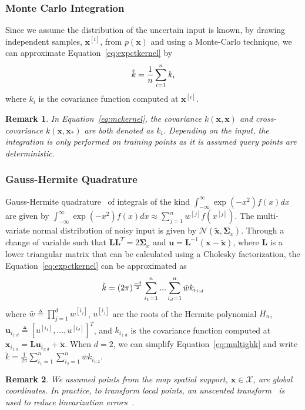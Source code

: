 \documentclass[letterpaper, 10 pt, journal, twoside]{IEEEtran}  %
\newtheorem{remark}{Remark}
\begin{document}
\subsubsection*{Monte Carlo Integration}
\label{subsubsec:montecarlo}
Since we assume the distribution of the uncertain input is known, by drawing independent samples, $\boldsymbol x^{[i]}$, from $p(\boldsymbol x)$ and using a Monte-Carlo technique, we can approximate Equation~\eqref{eq:expctkernel} by
\begin{equation}
 \small
 \label{eq:mckernel}
 \tilde{k} = \frac{1}{n}\sum_{i=1}^{n}k_i
\end{equation}
where $k_i$ is the covariance function computed at $\boldsymbol x^{[i]}$.
\begin{remark}
 In Equation~\eqref{eq:mckernel}, the covariance $k(\boldsymbol x,\boldsymbol x)$ and cross-covariance $k(\boldsymbol x,\boldsymbol x_*)$ are both denoted as $k_i$. Depending on the input, the integration is only performed on training points as it is assumed query points are deterministic.
\end{remark}

\subsubsection*{Gauss-Hermite Quadrature}
\label{subsubsec:gausshermit}
Gauss-Hermite quadrature~\cite{davis2007methods} of integrals of the kind $\int_{-\infty}^{\infty} \exp(-x^2)f(x)dx$ are given by $\int_{-\infty}^{\infty} \exp(-x^2)f(x)dx \approx \sum_{j=1}^n w^{[j]} f(x^{[j]})$.
The multi-variate normal distribution of noisy input is given by $\mathcal{N}(\boldsymbol{\tilde{x}}, \boldsymbol\Sigma_x)$. Through a change of variable such that $\boldsymbol L \boldsymbol L^{T} = 2\boldsymbol\Sigma_x$ and $\boldsymbol u = \boldsymbol L^{-1}(\boldsymbol x - \boldsymbol{\tilde{x}})$, where $\boldsymbol L$ is a lower triangular matrix that can be calculated using a Cholesky factorization, the Equation~\eqref{eq:expctkernel} can be approximated as
\begin{equation}
 \small
\label{eq:multighk}
 \tilde{k} = (2\pi)^{\frac{-d}{2}} \sum_{i_1=1}^{n} ... \sum_{i_d=1}^{n} \bar{w} k_{i_{1:d}}
\end{equation}
where $\bar{w} \triangleq \prod_{j=1}^{d} w^{[i_{j}]}$, $u^{[i_{j}]}$ are the roots of the Hermite polynomial $H_n$, $\boldsymbol u_{i_{1:d}} \triangleq [u^{[i_{1}]},...,u^{[i_{d}]}]^T$, and $k_{i_{1:d}}$ is the covariance function computed at $\boldsymbol x_{i_{1:d}} = \boldsymbol L \boldsymbol u_{i_{1:d}} + \boldsymbol{\tilde{x}}$. When $d=2$, we can simplify Equation~\eqref{eq:multighk} and write \mbox{$\tilde{k} = \frac{1}{2\pi} \sum_{i_1=1}^{n}\sum_{i_2=1}^{n} \bar{w} k_{i_{1:2}}$}.
\begin{remark}
 We assumed points from the map spatial support, $\boldsymbol x \in \mathcal{X}$, are global coordinates. In practice, to transform local points, an unscented transform~\cite{julier1997new} is used to reduce linearization errors~\cite{o2010contextual}.
\end{remark}
\end{document}
